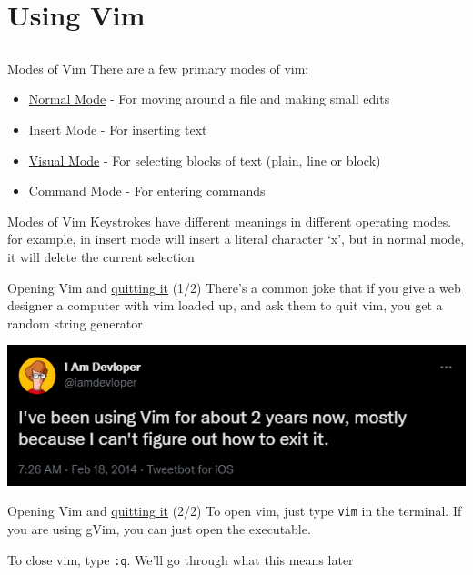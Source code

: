 \documentclass[12pt]{beamer}
\begin{document}
\section{Using Vim}
\subsection{}

\begin{frame}{Modes of Vim}
    There are a few primary modes of vim:
    \begin{itemize}
        \item \underline{Normal Mode} - For moving around a file and making small edits
        \item \underline{Insert Mode} - For inserting text
        \item \underline{Visual Mode} - For selecting blocks of text (plain, line or block)
        \item \underline{Command Mode} - For entering commands
    \end{itemize}{}
\end{frame}{}

\begin{frame}{Modes of Vim}
    Keystrokes have different meanings in different operating modes. for example,  in insert mode will insert a literal character ‘x’, but in normal mode, it will delete the current selection
\end{frame}{}

\begin{frame}{Opening Vim and \underline{quitting it} (1/2)}
    There's a common joke that if you give a web designer a computer with vim loaded up, and ask them to quit vim, 
    you get a random string generator
    
    \includegraphics[width=1\linewidth]{exit_vim.png}
\end{frame}

\begin{frame}{Opening Vim and \underline{quitting it} (2/2)}
    To open vim, just type \texttt{vim} in the terminal. If you are using gVim, you can just open the executable.
    
    To close vim, type \texttt{:q}. We'll go through what this means later
\end{frame}{}
\end{document}
